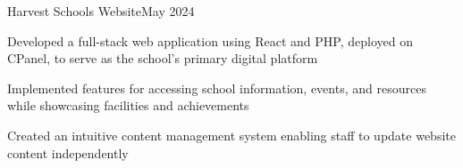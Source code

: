 \begin{resume_subsection}{Harvest Schools Website}{May 2024}
    \begin{subitems}
        \item Developed a full-stack web application using React and PHP, deployed on CPanel, to serve as the school's primary digital platform
        \item Implemented features for accessing school information, events, and resources while showcasing facilities and achievements
        \item Created an intuitive content management system enabling staff to update website content independently
    \end{subitems}
\end{resume_subsection}

